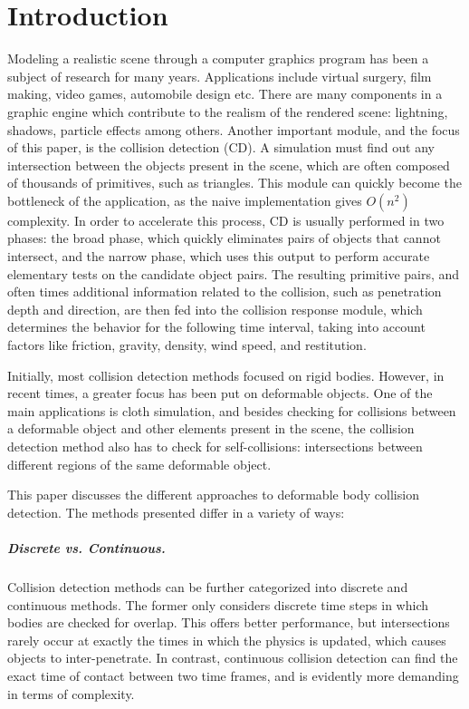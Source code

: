 \chapter{Introduction}
\label{section:intro}

Modeling a realistic scene through a computer graphics program has been a subject of research for many years. Applications include virtual surgery, film making, video games, automobile design etc. There are many components in a graphic engine which contribute to the realism of the rendered scene: lightning, shadows, particle effects among others. Another important module, and the focus of this paper, is the collision detection (CD). A simulation must find out any intersection between the objects present in the scene, which are often composed of thousands of primitives, such as triangles. This module can quickly become the bottleneck of the application, as the naive implementation gives $O(n^{2})$ complexity. In order to accelerate this process, CD is usually performed in two phases: the broad phase, which quickly eliminates pairs of objects that cannot intersect, and the narrow phase, which uses this output to perform accurate elementary tests on the candidate object pairs. The resulting primitive pairs, and often times additional information related to the collision, such as penetration depth and direction, are then fed into the collision response module, which determines the behavior for the following time interval, taking into account factors like friction, gravity, density, wind speed, and restitution.

Initially, most collision detection methods focused on rigid bodies. However, in recent times, a greater focus has been put on deformable objects. One of the main applications is cloth simulation, and besides checking for collisions between a deformable object and other elements present in the scene, the collision detection method also has to check for self-collisions: intersections between different regions of the same deformable object.

This paper discusses the different approaches to deformable body collision detection. The methods presented differ in a variety of ways:

\paragraph{Discrete vs. Continuous.}

Collision detection methods can be further categorized into discrete and continuous methods. The former only considers discrete time steps in which bodies are checked for overlap. This offers better performance, but intersections rarely occur at exactly the times in which the physics is updated, which causes objects to inter-penetrate. In contrast, continuous collision detection can find the exact time of contact between two time frames, and is evidently more demanding in terms of complexity.

